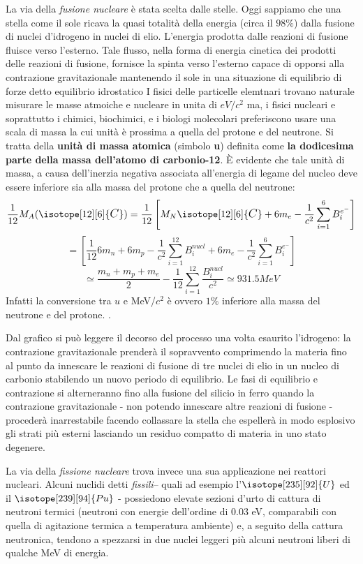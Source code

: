 La via della \emph{fusione nucleare} è stata scelta dalle stelle.
Oggi sappiamo che una stella come il sole ricava la quasi totalità della energia
(circa il \(98 \%\)) dalla fusione di nuclei d'idrogeno in nuclei di
elio.
L'energia prodotta dalle reazioni di fusione fluisce verso
l'esterno.
Tale flusso, nella forma di energia cinetica dei prodotti
delle reazioni di fusione, fornisce la spinta verso l'esterno capace di
opporsi alla contrazione gravitazionale mantenendo il sole in una
situazione di equilibrio di forze detto equilibrio idrostatico\sidenote
{
I fisici delle particelle elemtnari trovano naturale misurare le masse atmoiche e nucleare in unita di $ eV/c^2$
ma, i fisici nucleari e soprattutto i chimici, biochimici, e i biologi molecolari preferiscono usare una scala di
massa la cui unità è prossima a quella del protone e del neutrone.
Si tratta della \textbf{unità di massa atomica} (simbolo \textbf{u}) definita come \textbf{la dodicesima parte della massa
dell'atomo di carbonio-12}.
È evidente che tale unità di massa, a causa dell'inerzia negativa associata all'energia di legame del nucleo deve essere
inferiore sia alla massa del protone che a quella del neutrone:
\[
   \frac{1}{12} M_A (\isotope[12][6]{\mathlarger{C}}) = \frac{1}{12} \left[M_N \isotope[12][6]{\mathlarger{C}} + 6 m_e -
	\frac{1}{{c}^{2}} \sum_{i = 1 }^{6} B_i^{e^-} \right]
\]
\[
	= \left[\frac{1}{12} 6 m_n + 6 m_p - \frac{1}{{c}^{2}} \sum_{i = 1 }^{12} B_i^{nucl} + 6 m_e -
	\frac{1}{{c}^{2}} \sum_{i = 1 }^{6} B_i^{e^-}\right]
\]
\[
	\simeq \frac{m_n + m_p + m_e}{2} - \frac{1}{12} \sum_{i = 1 }^{12} \frac{B_i^{nucl} }{{c}^{2}}
	\simeq 931.5 MeV
\]
Infatti la conversione tra $u$ e MeV/$c^2$ è ovvero $ 1 \%$ inferiore alla massa del neutrone e del protone.
}.

Dal grafico si può leggere il decorso del processo una volta esaurito
l'idrogeno: la contrazione gravitazionale prenderà il sopravvento
comprimendo la materia fino al punto da innescare le reazioni di fusione
di tre nuclei di elio in un nucleo di carbonio stabilendo un nuovo
periodo di equilibrio.
Le fasi di equilibrio e contrazione si
alterneranno fino alla fusione del silicio in ferro quando la
contrazione gravitazionale - non potendo innescare altre reazioni di
fusione - procederà inarrestabile facendo collassare la stella che
espellerà in modo esplosivo gli strati più esterni lasciando un residuo
compatto di materia in uno stato degenere.

La via della \emph{fissione nucleare} trova invece una sua applicazione
nei reattori nucleari.
Alcuni nuclidi detti \emph{fissili}– quali ad esempio l'$ \isotope[235][92]{\mathlarger{U}}$
ed il $ \isotope[239][94]{\mathlarger{Pu}}$ - possiedono elevate sezioni d’urto di cattura di neutroni termici
(neutroni con energie dell’ordine di 0.03 eV, comparabili con quella di agitazione termica a temperatura ambiente) e,
a seguito della cattura neutronica, tendono a spezzarsi in due nuclei leggeri più alcuni neutroni liberi di
qualche MeV di energia.

